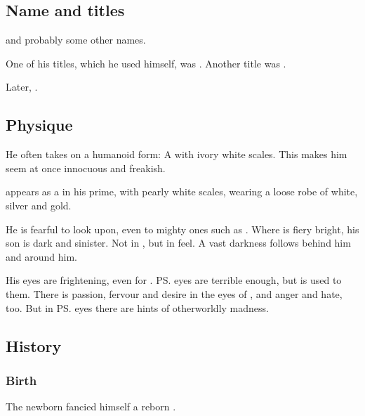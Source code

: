 \subsection{Name and titles}
\Vizsherioch and probably some other names. 

One of his titles, which he used himself, was . 
Another title was .

Later,  . 









\subsection{Physique}
He often takes on a humanoid form: 
A \scatha{} with ivory white scales. 
This makes him seem at once innocuous and freakish. 

\Vizsherioch appears as a \dax in his prime, with pearly white scales, wearing a loose robe of white, silver and gold. 

He is fearful to look upon, even to mighty ones such as \LocarPsyrex. 
Where \Secherdamon is fiery bright, his son \Vizsherioch is dark and sinister. 
Not in \colour, but in feel. 
A vast darkness follows behind him and around him. 

His eyes are frightening, even for \Psyrex. 
\ps{\Secherdamon} eyes are terrible enough, but \Psyrex is used to them. 
There is passion, fervour and desire in the eyes of \Secherdamon, and anger and hate, too. 
But in \ps{\Vizsherioch} eyes there are hints of otherworldly madness. 










\subsection{History}





\subsubsection{Birth}
The newborn \Vizsherioch{} fancied himself a reborn \xs. 

